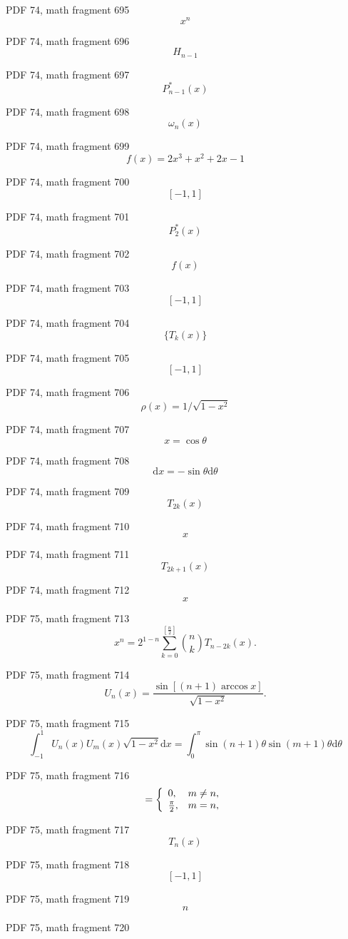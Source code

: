 \documentclass[UTF8,fontset=fandol]{ctexart}
\begin{document}
PDF 74, math fragment 695
\[x^n\]
\par
PDF 74, math fragment 696
\[H_{n-1}\]
\par
PDF 74, math fragment 697
\[P_{n-1}^*(x)\]
\par
PDF 74, math fragment 698
\[\omega_n(x)\]
\par
PDF 74, math fragment 699
\[f(x) = 2x^3 + x^2 + 2x - 1\]
\par
PDF 74, math fragment 700
\[[-1,1]\]
\par
PDF 74, math fragment 701
\[P_{2}^*(x)\]
\par
PDF 74, math fragment 702
\[f(x)\]
\par
PDF 74, math fragment 703
\[[-1,1]\]
\par
PDF 74, math fragment 704
\[\{T_k(x)\}\]
\par
PDF 74, math fragment 705
\[[-1,1]\]
\par
PDF 74, math fragment 706
\[\rho(x) = 1 / \sqrt{1-x^2}\]
\par
PDF 74, math fragment 707
\[x = \cos \theta\]
\par
PDF 74, math fragment 708
\[\mathrm{d}x = -\sin \theta \mathrm{d}\theta\]
\par
PDF 74, math fragment 709
\[T_{2k}(x)\]
\par
PDF 74, math fragment 710
\[x\]
\par
PDF 74, math fragment 711
\[T_{2k+1}(x)\]
\par
PDF 74, math fragment 712
\[x\]
\par
PDF 75, math fragment 713
\[
x^n = 2^{1-n} \sum_{k=0}^{[\frac{n}{2}]} \binom{n}{k} T_{n-2k}(x). \tag{3.4.9}
\]
\par
PDF 75, math fragment 714
\[
U_n(x) = \frac{\sin[(n+1)\arccos x]}{\sqrt{1-x^2}}. \tag{3.4.10}
\]
\par
PDF 75, math fragment 715
\[
\int_{-1}^{1} U_n(x) U_m(x) \sqrt{1-x^2} \mathrm{d}x = \int_{0}^{\pi} \sin(n+1)\theta \sin(m+1)\theta \mathrm{d}\theta
\]
\par
PDF 75, math fragment 716
\[
= \left\{ \begin{array}{l l} 0, & m \neq n, \\ \frac{\pi}{2}, & m=n, \end{array} \right.
\]
\par
PDF 75, math fragment 717
\[T_n(x)\]
\par
PDF 75, math fragment 718
\[[-1,1]\]
\par
PDF 75, math fragment 719
\[n\]
\par
PDF 75, math fragment 720
\end{document}

